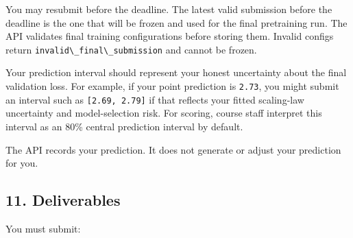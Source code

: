 \documentclass[
  11pt,
]{article}
\newcommand{\passthrough}[1]{#1}
\begin{document}
You may resubmit before the deadline. The latest valid submission before
the deadline is the one that will be frozen and used for the final
pretraining run. The API validates final training configurations before
storing them. Invalid configs return
\passthrough{\lstinline!invalid\_final\_submission!} and cannot be
frozen.

Your prediction interval should represent your honest uncertainty about
the final validation loss. For example, if your point prediction is
\passthrough{\lstinline!2.73!}, you might submit an interval such as
\passthrough{\lstinline![2.69, 2.79]!} if that reflects your fitted
scaling-law uncertainty and model-selection risk. For scoring, course
staff interpret this interval as an 80\% central prediction interval by
default.

The API records your prediction. It does not generate or adjust your
prediction for you.

\hypertarget{deliverables}{%
\subsection{11. Deliverables}\label{deliverables}}

You must submit:
\end{document}
